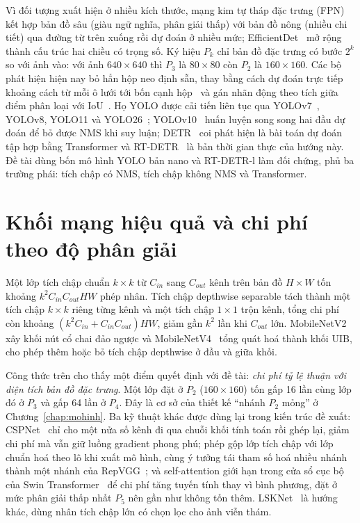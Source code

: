 Vì đối tượng xuất hiện ở nhiều kích thước, mạng kim tự tháp đặc trưng (FPN)~\cite{lin2017fpn} kết hợp bản đồ sâu (giàu ngữ nghĩa, phân giải thấp) với bản đồ nông (nhiều chi tiết) qua đường từ trên xuống rồi dự đoán ở nhiều mức; EfficientDet~\cite{tan2020efficientdet} mở rộng thành cấu trúc hai chiều có trọng số. Ký hiệu $P_k$ chỉ bản đồ đặc trưng có bước $2^k$ so với ảnh vào: với ảnh $640\times640$ thì $P_3$ là $80\times80$ còn $P_2$ là $160\times160$. Các bộ phát hiện hiện nay bỏ hẳn hộp neo định sẵn, thay bằng cách dự đoán trực tiếp khoảng cách từ mỗi ô lưới tới bốn cạnh hộp~\cite{tian2019fcos} và gán nhãn động theo tích giữa điểm phân loại với IoU~\cite{feng2021tood}. Họ YOLO được cải tiến liên tục qua YOLOv7~\cite{wang2023yolov7}, YOLOv8, YOLO11 và YOLO26~\cite{ultralytics}; YOLOv10~\cite{wang2024yolov10} huấn luyện song song hai đầu dự đoán để bỏ được NMS khi suy luận; DETR~\cite{carion2020detr} coi phát hiện là bài toán dự đoán tập hợp bằng Transformer và RT-DETR~\cite{zhao2024rtdetr} là bản thời gian thực của hướng này. Đề tài dùng bốn mô hình YOLO bản nano và RT-DETR-l làm đối chứng, phủ ba trường phái: tích chập có NMS, tích chập không NMS và Transformer.

\section{Khối mạng hiệu quả và chi phí theo độ phân giải}

Một lớp tích chập chuẩn $k\times k$ từ $C_{in}$ sang $C_{out}$ kênh trên bản đồ $H\times W$ tốn khoảng $k^2 C_{in} C_{out} H W$ phép nhân. Tích chập depthwise separable tách thành một tích chập $k\times k$ riêng từng kênh và một tích chập $1\times1$ trộn kênh, tổng chi phí còn khoảng $(k^2 C_{in} + C_{in} C_{out}) H W$, giảm gần $k^2$ lần khi $C_{out}$ lớn. MobileNetV2~\cite{sandler2018mobilenetv2} xây khối nút cổ chai đảo ngược và MobileNetV4~\cite{qin2024mnv4} tổng quát hoá thành khối UIB, cho phép thêm hoặc bỏ tích chập depthwise ở đầu và giữa khối.

Công thức trên cho thấy một điểm quyết định với đề tài: \textit{chi phí tỷ lệ thuận với diện tích bản đồ đặc trưng}. Một lớp đặt ở $P_2$ ($160\times160$) tốn gấp 16 lần cùng lớp đó ở $P_3$ và gấp 64 lần ở $P_4$. Đây là cơ sở của thiết kế ``nhánh $P_2$ mỏng'' ở Chương~\ref{chap:mohinh}. Ba kỹ thuật khác được dùng lại trong kiến trúc đề xuất: CSPNet~\cite{wang2020cspnet} chỉ cho một nửa số kênh đi qua chuỗi khối tính toán rồi ghép lại, giảm chi phí mà vẫn giữ luồng gradient phong phú; phép gộp lớp tích chập với lớp chuẩn hoá theo lô khi xuất mô hình, cùng ý tưởng tái tham số hoá nhiều nhánh thành một nhánh của RepVGG~\cite{ding2021repvgg}; và self-attention giới hạn trong cửa sổ cục bộ của Swin Transformer~\cite{liu2021swin} để chi phí tăng tuyến tính thay vì bình phương, đặt ở mức phân giải thấp nhất $P_5$ nên gần như không tốn thêm. LSKNet~\cite{li2023lsknet} là hướng khác, dùng nhân tích chập lớn có chọn lọc cho ảnh viễn thám.

